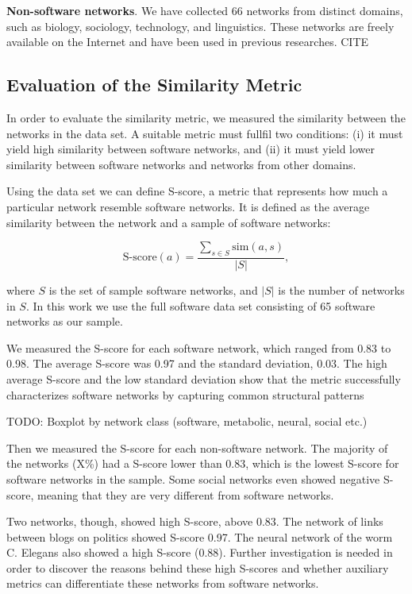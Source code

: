 \textbf{Non-software networks}. We have collected 66 networks from distinct
domains, such as biology, sociology, technology, and linguistics. These networks
are freely available on the Internet and have been used in previous researches.
CITE


\subsection{Evaluation of the Similarity Metric}

In order to evaluate the similarity metric, we measured the similarity between
the networks in the data set. A suitable metric must fullfil two conditions: (i)
it must yield high similarity between software networks, and (ii) it must yield
lower similarity between software networks and networks from other domains.

Using the data set we can define S-score, a metric that represents how much a
particular network resemble software networks. It is defined as the average
similarity between the network and a sample of software networks:

$$
\mathrm{S\mbox{-}score}(a) = \frac{
\sum_{s \in S} \mathrm{sim}(a, s)
}{|S|} \mathrm{,}
$$

where $S$ is the set of sample software networks, and $|S|$ is the number of
networks in $S$. In this work we use the full software data set consisting of 65
software networks as our sample.

We measured the S-score for each software network, which ranged from 0.83 to
0.98. The average S-score was 0.97 and the standard deviation, 0.03. The high
average S-score and the low standard deviation show that the metric successfully
characterizes software networks by capturing common structural patterns

TODO: Boxplot by network class (software, metabolic, neural, social etc.)

Then we measured the S-score for each non-software network. The majority of the
networks (X\%) had a S-score lower than 0.83, which is the lowest S-score for
software networks in the sample. Some social networks even showed negative
S-score, meaning that they are very different from software networks.

Two networks, though, showed high S-score, above 0.83. The network of links
between blogs on politics showed S-score 0.97. The neural network of the worm
C. Elegans also showed a high S-score (0.88). Further investigation is needed
in order to discover the reasons behind these high S-scores and whether
auxiliary metrics can differentiate these networks from software networks.

